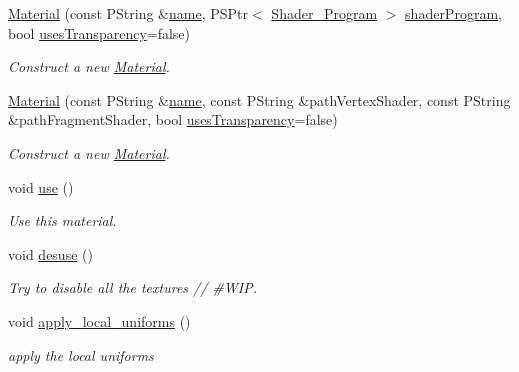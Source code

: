 \begin{DoxyCompactItemize}
\item 
\mbox{\hyperlink{classprz_1_1_material_a96a970f9168c10c004c906a10ccd7681}{Material}} (const P\+String \&\mbox{\hyperlink{classprz_1_1_material_ab1b2f9074aea77954b1ad70b72f48c3a}{name}}, P\+S\+Ptr$<$ \mbox{\hyperlink{classprz_1_1_shader___program}{Shader\+\_\+\+Program}} $>$ \mbox{\hyperlink{classprz_1_1_material_a258f2af6b3141b29ecc1c07968da1e0a}{shader\+Program}}, bool \mbox{\hyperlink{classprz_1_1_material_aa27abc0a7c69fa88cac4d075a082d78c}{uses\+Transparency}}=false)
\begin{DoxyCompactList}\small\item\em Construct a new \mbox{\hyperlink{classprz_1_1_material}{Material}}. \end{DoxyCompactList}\item 
\mbox{\hyperlink{classprz_1_1_material_af550371d4213e10a001a8ee9b27a1c79}{Material}} (const P\+String \&\mbox{\hyperlink{classprz_1_1_material_ab1b2f9074aea77954b1ad70b72f48c3a}{name}}, const P\+String \&path\+Vertex\+Shader, const P\+String \&path\+Fragment\+Shader, bool \mbox{\hyperlink{classprz_1_1_material_aa27abc0a7c69fa88cac4d075a082d78c}{uses\+Transparency}}=false)
\begin{DoxyCompactList}\small\item\em Construct a new \mbox{\hyperlink{classprz_1_1_material}{Material}}. \end{DoxyCompactList}\item 
void \mbox{\hyperlink{classprz_1_1_material_a82bf213bb5c6a403812dab39ac3d7e5a}{use}} ()
\begin{DoxyCompactList}\small\item\em Use this material. \end{DoxyCompactList}\item 
void \mbox{\hyperlink{classprz_1_1_material_a67f3f1c440c489c784f8beb5b61ff3a0}{desuse}} ()
\begin{DoxyCompactList}\small\item\em Try to disable all the textures // \#\+W\+IP. \end{DoxyCompactList}\item 
void \mbox{\hyperlink{classprz_1_1_material_a294a63c3dc02bf9e5b2ff283e2789313}{apply\+\_\+local\+\_\+uniforms}} ()
\begin{DoxyCompactList}\small\item\em apply the local uniforms \end{DoxyCompactList}\item 

\end{DoxyCompactItemize}
